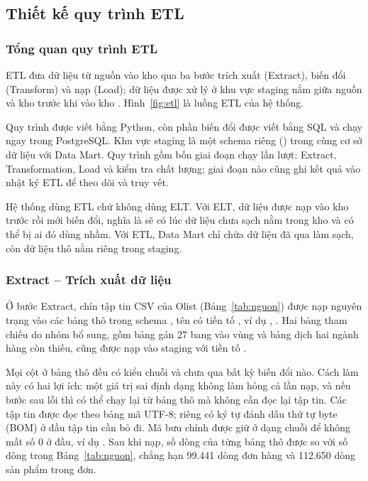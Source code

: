 \subsection{Thiết kế quy trình ETL}
\subsubsection{Tổng quan quy trình ETL}

ETL đưa dữ liệu từ nguồn vào kho qua ba bước trích xuất (Extract), biến đổi (Transform) và nạp (Load); dữ liệu được xử lý ở khu vực staging nằm giữa nguồn và kho trước khi vào kho \cite{kimball}. Hình~\ref{fig:etl} là luồng ETL của hệ thống.



Quy trình được viết bằng Python, còn phần biến đổi được viết bằng SQL và chạy ngay trong PostgreSQL. Khu vực staging là một schema riêng () trong cùng cơ sở dữ liệu với Data Mart. Quy trình gồm bốn giai đoạn chạy lần lượt: Extract, Transformation, Load và kiểm tra chất lượng; giai đoạn nào cũng ghi kết quả vào nhật ký ETL để theo dõi và truy vết.

Hệ thống dùng ETL chứ không dùng ELT. Với ELT, dữ liệu được nạp vào kho trước rồi mới biến đổi, nghĩa là sẽ có lúc dữ liệu chưa sạch nằm trong kho và có thể bị ai đó dùng nhầm. Với ETL, Data Mart chỉ chứa dữ liệu đã qua làm sạch, còn dữ liệu thô nằm riêng trong staging.

\subsubsection{Extract -- Trích xuất dữ liệu}

Ở bước Extract, chín tập tin CSV của Olist (Bảng~\ref{tab:nguon}) được nạp nguyên trạng vào các bảng thô trong schema , tên có tiền tố , ví dụ , . Hai bảng tham chiếu do nhóm bổ sung, gồm bảng gán 27 bang vào vùng và bảng dịch hai ngành hàng còn thiếu, cũng được nạp vào staging với tiền tố .

Mọi cột ở bảng thô đều có kiểu chuỗi và chưa qua bất kỳ biến đổi nào. Cách làm này có hai lợi ích: một giá trị sai định dạng không làm hỏng cả lần nạp, và nếu bước sau lỗi thì có thể chạy lại từ bảng thô mà không cần đọc lại tập tin. Các tập tin được đọc theo bảng mã UTF-8; riêng  có ký tự đánh dấu thứ tự byte (BOM) ở đầu tập tin cần bỏ đi. Mã bưu chính được giữ ở dạng chuỗi để không mất số 0 ở đầu, ví dụ . Sau khi nạp, số dòng của từng bảng thô được so với số dòng trong Bảng~\ref{tab:nguon}, chẳng hạn 99.441 dòng đơn hàng và 112.650 dòng sản phẩm trong đơn.

